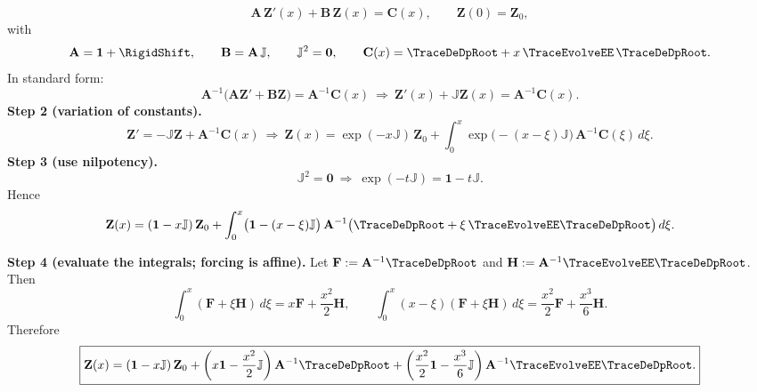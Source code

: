 
\[
\mathbf{A}\,\mathbf{Z}'(x)+\mathbf{B}\,\mathbf{Z}(x)=\mathbf{C}(x),\qquad 
\mathbf{Z}(0)=\mathbf{Z}_0,
\]
with
\[
\mathbf{A}=\mathbf{1} + \RigidShift,\qquad \mathbf{B}=\mathbf{A}\,\mathbb{J},\qquad \mathbb{J}^2=\mathbf{0},
\qquad 
\mathbf{C}(x)=\TraceDeDpRoot+x\,\TraceEvolveEE\,\TraceDeDpRoot.
\]
In standard form:
\[
\mathbf{A}^{-1}\bigl(\mathbf{A}\mathbf{Z}'+\mathbf{B}\mathbf{Z}\bigr)=\mathbf{A}^{-1}\mathbf{C}(x)
\ \Longrightarrow\
\mathbf{Z}'(x)+\mathbb{J}\mathbf{Z}(x)=\mathbf{A}^{-1}\mathbf{C}(x).
\]
\textbf{Step 2 (variation of constants).}
\[
\mathbf{Z}'=-\mathbb{J}\mathbf{Z}+\mathbf{A}^{-1}\mathbf{C}(x)
\ \Longrightarrow\
\mathbf{Z}(x)=\exp(-x\mathbb{J})\,\mathbf{Z}_0+\int_{0}^{x}\exp\!\bigl(-(x-\xi)\mathbb{J}\bigr)\,\mathbf{A}^{-1}\mathbf{C}(\xi)\,d\xi.
\]
\textbf{Step 3 (use nilpotency).}
\[
\mathbb{J}^2=\mathbf{0}\ \Longrightarrow\ 
\exp(-t\mathbb{J})=\mathbf{1}-t\mathbb{J}.
\]
Hence
\[
\mathbf{Z}(x)=(\mathbf{1}-x\mathbb{J})\,\mathbf{Z}_0
+\int_{0}^{x}\bigl(\mathbf{1}-(x-\xi)\mathbb{J}\bigr)\,
\mathbf{A}^{-1}\bigl(\TraceDeDpRoot+\xi\,\TraceEvolveEE\TraceDeDpRoot\bigr)\,d\xi.
\]


\textbf{Step 4 (evaluate the integrals; forcing is affine).}
Let \(\mathbf{F}:=\mathbf{A}^{-1}\TraceDeDpRoot\) and \(\mathbf{H}:=\mathbf{A}^{-1}\TraceEvolveEE\TraceDeDpRoot\). Then
\[
\int_{0}^{x}(\mathbf{F}+\xi\mathbf{H})\,d\xi=x\mathbf{F}+\frac{x^{2}}{2}\mathbf{H},
\qquad
\int_{0}^{x}(x-\xi)(\mathbf{F}+\xi\mathbf{H})\,d\xi=\frac{x^{2}}{2}\mathbf{F}+\frac{x^{3}}{6}\mathbf{H}.
\]
Therefore
\[
\boxed{
\mathbf{Z}(x)
=(\mathbf{1}-x\mathbb{J})\,\mathbf{Z}_0
+\left(x\mathbf{1}-\frac{x^{2}}{2}\mathbb{J}\right)\mathbf{A}^{-1}\TraceDeDpRoot
+\left(\frac{x^{2}}{2}\mathbf{1}-\frac{x^{3}}{6}\mathbb{J}\right)\mathbf{A}^{-1}\TraceEvolveEE\TraceDeDpRoot.
}
\]
